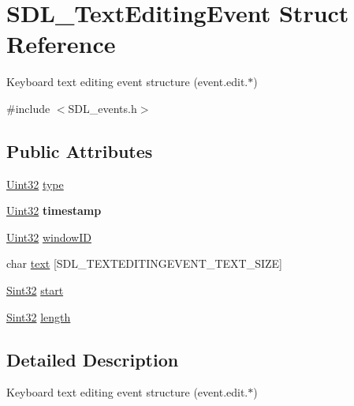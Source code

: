 \hypertarget{struct_s_d_l___text_editing_event}{}\section{S\+D\+L\+\_\+\+Text\+Editing\+Event Struct Reference}
\label{struct_s_d_l___text_editing_event}


Keyboard text editing event structure (event.\+edit.$\ast$)  




{\ttfamily \#include $<$S\+D\+L\+\_\+events.\+h$>$}

\subsection*{Public Attributes}
\begin{DoxyCompactItemize}
\item 
\hyperlink{_s_d_l__stdinc_8h_add440eff171ea5f55cb00c4a9ab8672d}{Uint32} \hyperlink{struct_s_d_l___text_editing_event_a198e6df194a3bf12cf5f82553e84c7cb}{type}
\item 
\mbox{\label{struct_s_d_l___text_editing_event_afc164f40abee6fd8e72e01b589210c75}} 
\hyperlink{_s_d_l__stdinc_8h_add440eff171ea5f55cb00c4a9ab8672d}{Uint32} {\bfseries timestamp}
\item 
\hyperlink{_s_d_l__stdinc_8h_add440eff171ea5f55cb00c4a9ab8672d}{Uint32} \hyperlink{struct_s_d_l___text_editing_event_a23b3e414cf7a7ccc547b7595ca930049}{window\+ID}
\item 
char \hyperlink{struct_s_d_l___text_editing_event_a29848c2e7819ea98ae8fb08543e6d420}{text} \mbox{[}S\+D\+L\+\_\+\+T\+E\+X\+T\+E\+D\+I\+T\+I\+N\+G\+E\+V\+E\+N\+T\+\_\+\+T\+E\+X\+T\+\_\+\+S\+I\+ZE\mbox{]}
\item 
\hyperlink{_s_d_l__stdinc_8h_a7a90b941db9d4582e9ad7abb9940ff7e}{Sint32} \hyperlink{struct_s_d_l___text_editing_event_ac6c6a00835d92b12c0ba5b78b5ad676d}{start}
\item 
\hyperlink{_s_d_l__stdinc_8h_a7a90b941db9d4582e9ad7abb9940ff7e}{Sint32} \hyperlink{struct_s_d_l___text_editing_event_adca95505c0bf212834930df58f6d1aa5}{length}
\end{DoxyCompactItemize}


\subsection{Detailed Description}
Keyboard text editing event structure (event.\+edit.$\ast$) 

